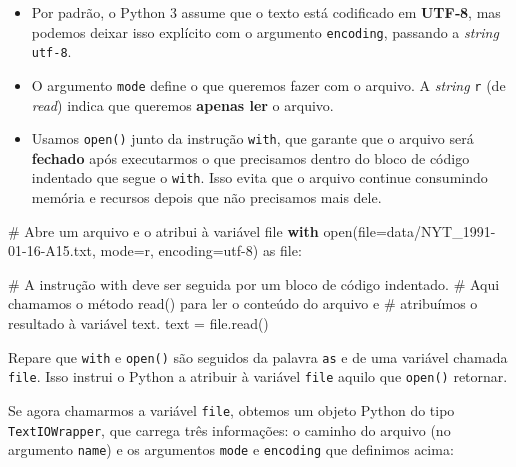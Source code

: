 \documentclass[
  brazilian,
  11pt,
]{article}
\newenvironment{Shaded}{\begin{snugshade}}{\end{snugshade}}
\newcommand{\BuiltInTok}[1]{\textcolor[rgb]{0.50,0.55,0.55}{#1}}
\newcommand{\CommentTok}[1]{\textcolor[rgb]{0.48,0.49,0.49}{#1}}
\newcommand{\ControlFlowTok}[1]{\textcolor[rgb]{0.99,0.74,0.29}{\textbf{#1}}}
\newcommand{\ImportTok}[1]{\textcolor[rgb]{0.15,0.68,0.38}{#1}}
\newcommand{\NormalTok}[1]{\textcolor[rgb]{0.81,0.81,0.76}{#1}}
\newcommand{\OperatorTok}[1]{\textcolor[rgb]{0.81,0.81,0.76}{#1}}
\newcommand{\StringTok}[1]{\textcolor[rgb]{0.96,0.31,0.31}{#1}}
\providecommand{\tightlist}{%
  \setlength{\itemsep}{0pt}\setlength{\parskip}{0pt}}
\let\oldtexttt\texttt
\renewcommand{\texttt}[1]{{\color{inlink}\oldtexttt{#1}}}
\begin{document}
\begin{itemize}
\tightlist
\item
  Por padrão, o Python 3 assume que o texto está codificado em
  \textbf{UTF‑8}, mas podemos deixar isso explícito com o argumento
  \texttt{encoding}, passando a \emph{string} \texttt{utf-8}.
\item
  O argumento \texttt{mode} define o que queremos fazer com o arquivo. A
  \emph{string} \texttt{r} (de \emph{read}) indica que queremos
  \textbf{apenas ler} o arquivo.
\item
  Usamos \texttt{open()} junto da instrução \texttt{with}, que garante
  que o arquivo será \textbf{fechado} após executarmos o que precisamos
  dentro do bloco de código indentado que segue o \texttt{with}. Isso
  evita que o arquivo continue consumindo memória e recursos depois que
  não precisamos mais dele.
\end{itemize}

\begin{Shaded}
\begin{Highlighting}[]
\CommentTok{\# Abre um arquivo e o atribui à variável \textquotesingle{}file\textquotesingle{}}
\ControlFlowTok{with} \BuiltInTok{open}\NormalTok{(}\BuiltInTok{file}\OperatorTok{=}\StringTok{\textquotesingle{}data/NYT\_1991{-}01{-}16{-}A15.txt\textquotesingle{}}\NormalTok{, mode}\OperatorTok{=}\StringTok{\textquotesingle{}r\textquotesingle{}}\NormalTok{, encoding}\OperatorTok{=}\StringTok{\textquotesingle{}utf{-}8\textquotesingle{}}\NormalTok{) }\ImportTok{as} \BuiltInTok{file}\NormalTok{:}

    \CommentTok{\# A instrução \textquotesingle{}with\textquotesingle{} deve ser seguida por um bloco de código indentado.}
    \CommentTok{\# Aqui chamamos o método read() para ler o conteúdo do arquivo e}
    \CommentTok{\# atribuímos o resultado à variável \textquotesingle{}text\textquotesingle{}.}
\NormalTok{    text }\OperatorTok{=} \BuiltInTok{file}\NormalTok{.read()}
\end{Highlighting}
\end{Shaded}

Repare que \texttt{with} e \texttt{open()} são seguidos da palavra
\texttt{as} e de uma variável chamada \texttt{file}. Isso instrui o
Python a atribuir à variável \texttt{file} aquilo que \texttt{open()}
retornar.

Se agora chamarmos a variável \texttt{file}, obtemos um objeto Python do
tipo \texttt{TextIOWrapper}, que carrega três informações: o caminho do
arquivo (no argumento \texttt{name}) e os argumentos \texttt{mode} e
\texttt{encoding} que definimos acima:
\end{document}
